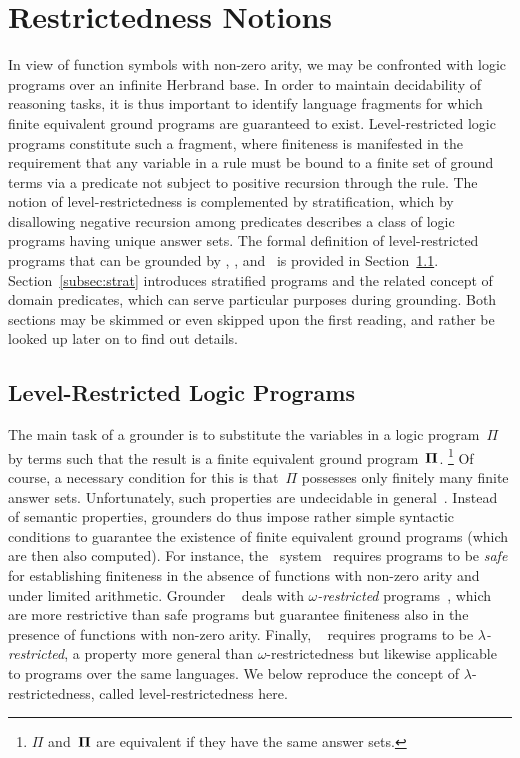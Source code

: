\section{Restrictedness Notions}\label{sec:restricted}

In view of function symbols with non-zero arity,
we may be confronted with logic programs over an infinite Herbrand base.
In order to maintain decidability of reasoning tasks,
it is thus important to identify language fragments for which
finite equivalent ground programs are guaranteed to exist.
Level-restricted logic programs constitute such a fragment,
where finiteness is manifested in the requirement that any variable in a rule
must be bound to a finite set of ground terms via a predicate not
subject to positive recursion through the rule.
The notion of level-restrictedness is complemented by stratification,
which by disallowing negative recursion among predicates describes a
class of logic programs having unique answer sets.
The formal definition of level-restricted programs
that can be grounded by \gringo, \clingo, and \iclingo\
is provided in Section~\ref{subsec:lambda}.
Section~\ref{subsec:strat} introduces stratified programs and the related
concept of domain predicates, which can serve particular purposes during grounding.
Both sections may be skimmed or even skipped upon the first reading,
and rather be looked up later on to find out details.


\subsection{Level-Restricted Logic Programs}\label{subsec:lambda}

The main task of a grounder is to substitute the variables in a logic program~$\Pi$
by terms such that the result is a finite equivalent ground program~$\mathbf{\Pi}$.%
\footnote{$\Pi$ and~$\mathbf{\Pi}$ are equivalent if they have the same answer sets.}
Of course, a necessary condition for this is that~$\Pi$ possesses
only finitely many finite answer sets.
Unfortunately, such properties are undecidable in general~\cite{daeigovo01a}.
Instead of semantic properties, grounders do thus impose rather simple syntactic
conditions to guarantee the existence of finite equivalent ground programs
(which are then also computed).
For instance, the \dlv\ system~\cite{dlv03a} requires programs to be \emph{safe} for
establishing finiteness in the absence of functions with non-zero arity and under
limited arithmetic.
Grounder \lparse~\cite{lparseManual} deals with \emph{$\omega$-restricted}
programs~\cite{syrjanen01a}, which are more restrictive than safe programs
but guarantee finiteness also in the presence of functions with non-zero arity.
Finally, \gringo~\cite{gescth07a} requires programs to be \emph{$\lambda$-restricted},
a property more general than $\omega$-restrictedness but likewise applicable
to programs over the same languages.
We below reproduce the concept of $\lambda$-restrictedness,
called level-restrictedness here.

